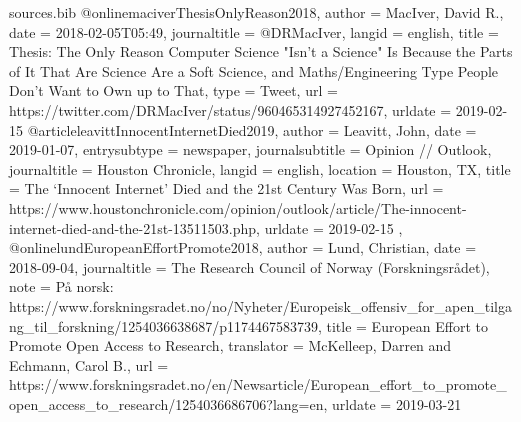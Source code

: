 %
%

\begin{filecontents}{sources.bib}
@online{maciverThesisOnlyReason2018,
  author = {MacIver, David R.},
  date = {2018-02-05T05:49},
  journaltitle = {@DRMacIver},
  langid = {english},
  title = {Thesis: The Only Reason {{Computer Science}} "Isn't a Science" Is Because the Parts of It That Are Science Are a Soft Science, and Maths/Engineering Type People Don't Want to Own up to That},
  type = {Tweet},
  url = {https://twitter.com/DRMacIver/status/960465314927452167},
  urldate = {2019-02-15}
}
@article{leavittInnocentInternetDied2019,
  author = {Leavitt, John},
  date = {2019-01-07},
  entrysubtype = {newspaper},
  journalsubtitle = {Opinion // Outlook},
  journaltitle = {Houston Chronicle},
  langid = {english},
  location = {{Houston, TX}},
  title = {The ‘Innocent Internet’ Died and the 21st Century Was Born},
  url = {https://www.houstonchronicle.com/opinion/outlook/article/The-innocent-internet-died-and-the-21st-13511503.php},
  urldate = {2019-02-15}
},
@online{lundEuropeanEffortPromote2018,
  author = {Lund, Christian},
  date = {2018-09-04},
  journaltitle = {The Research Council of Norway (Forskningsrådet)},
  note = {På norsk: https://www.forskningsradet.no/no/Nyheter/Europeisk\_offensiv\_for\_apen\_tilgang\_til\_forskning/1254036638687/p1174467583739},
  title = {European Effort to Promote Open Access to Research},
  translator = {McKelleep, Darren and Echmann, Carol B.},
  url = {https://www.forskningsradet.no/en/Newsarticle/European_effort_to_promote_open_access_to_research/1254036686706?lang=en},
  urldate = {2019-03-21}
}
\end{filecontents}


\documentclass{article}
\thispagestyle{empty}   %

\usepackage[utf8]{inputenc}

\usepackage[strict=true]{csquotes}

